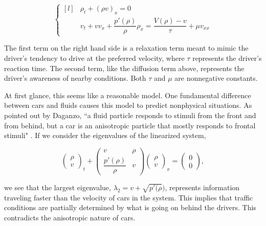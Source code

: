 \documentclass{article}
\begin{document}
\[ \left\{ \begin{matrix*}[l] & \rho_t + (\rho v)_x = 0 \\[1ex] & v_t + v v_x + \dfrac{p'(\rho)}{\rho} \rho_x = \dfrac{V(\rho) - v}{\tau} + \mu v_{xx} \end{matrix*} \right. \]

The first term on the right hand side is a relaxation term meant to mimic the driver's tendency to drive at the preferred velocity, where $\tau$ represents the driver's reaction time.  The second term, like the diffusion term above, represents the driver's awareness of nearby conditions.  Both $\tau$ and $\mu$ are nonnegative constants.  

At first glance, this seems like a reasonable model.  One fundamental difference between cars and fluids causes this model to predict nonphysical situations.  As pointed out by Daganzo, 	``a fluid particle responds to stimuli from the front and from behind, but a car is an anisotropic particle that mostly responds to frontal stimuli" \cite{Daganzo1995}.  If we consider the eigenvalues of the linearized system,

\[ \begin{pmatrix} \rho \\[1ex] v \end{pmatrix}_t + \begin{pmatrix} v & \rho \\[1ex] \dfrac{p'(\rho)}{\rho} & v \end{pmatrix} \begin{pmatrix} \rho \\[1ex] v \end{pmatrix}_x = \begin{pmatrix} 0 \\[1ex] 0 \end{pmatrix}, \]

we see that the largest eigenvalue, $\lambda_2 = v + \sqrt{p'(\rho})$, represents information traveling faster than the velocity of cars in the system.  This implies that traffic conditions are partially determined by what is going on behind the drivers.  This contradicts the anisotropic nature of cars. 

\end{document}
